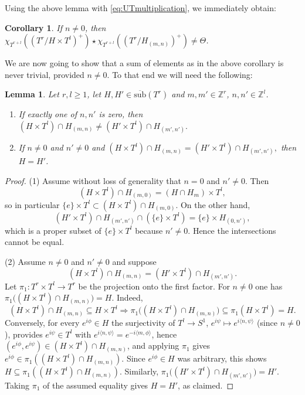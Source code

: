 \documentclass[reqno,twoside,12pt]{amsart}
\newtheorem{Corollary}[Remark]{Corollary}
\newtheorem{Lemma}[Remark]{Lemma}
\numberwithin{equation}{section} \errorcontextlines=0
\newcommand{\sub}{\overline{\mathrm{sub}}}
\begin{document}
Using the above lemma with \eqref{eq:UTmultiplication}, we immediately obtain:
\begin{Corollary}\label{cor:nontr-prod}
If $n\neq 0$, then
$\chi_{T^{r+l}} ((T^r/H\times T^{ l})^+ )\star \chi_{T^{r+l}} ((T^{r}/H_{(m,n)})^+ )\neq \Theta$.
\end{Corollary}

We are now going to show that a sum of elements as in the above corollary is never trivial, provided $n\neq 0$. To that end we will need the following:

\begin{Lemma}\label{lem:intersections}
Let $r,l\ge 1$, let $H,H'\in\sub(T^r)$ and $m,m'\in\mathbb{Z}^r$, $n,n'\in\mathbb{Z}^l$.
\begin{enumerate}
\item If exactly one of $n,n'$ is zero, then
$
(H\times T^l)\cap H_{(m,n)}\ne (H'\times T^l)\cap H_{(m',n')}.
$
\item If $n\ne 0$ and $n'\ne 0$ and
$
(H\times T^l)\cap H_{(m,n)}=(H'\times T^l)\cap H_{(m',n')},
$
then $H=H'$.
\end{enumerate}
\end{Lemma}

\begin{proof}
(1) Assume without loss of generality that $n=0$ and $n'\ne 0$. Then
\[
(H\times T^l)\cap H_{(m,0)}=(H\cap H_m)\times T^l,
\]
so in particular $\{e\}\times T^l\subset (H\times T^l)\cap H_{(m,0)}$. On the other hand,
\[
(H'\times T^l)\cap H_{(m',n')}\cap(\{e\}\times T^l)=\{e\}\times H_{(0,n')},
\]
which is a proper subset of $\{e\}\times T^l$ because $n'\ne 0$. Hence the intersections cannot be equal.

(2) Assume $n\ne 0$ and $n'\ne 0$ and suppose
$$
(H\times T^l)\cap H_{(m,n)}=(H'\times T^l)\cap H_{(m',n')}.
$$
Let $\pi_1:T^r\times T^l\to T^r$ be the projection onto the first factor. For $n\ne 0$ one has
$
\pi_1\big((H\times T^l)\cap H_{(m,n)}\big)=H.
$
Indeed,
$$(H\times T^l)\cap H_{(m,n)}\subseteq H\times T^l\Rightarrow
\pi_1\big((H\times T^l)\cap H_{(m,n)}\big)\subseteq \pi_1(H\times T^l) =H.$$
Conversely, for every $e^{i\phi}\in H$ the surjectivity of $T^l\to S^1$, $e^{i\psi}\mapsto e^{i\langle n,\psi\rangle}$ (since $n\ne 0$), provides $e^{i\psi}\in T^l$ with $e^{i\langle n,\psi\rangle}=e^{-i\langle m,\phi\rangle}$, hence $(e^{i\phi},e^{i\psi})\in(H\times T^l)\cap H_{(m,n)}$, and applying $\pi_1$ gives $e^{i\phi}\in\pi_1((H\times T^l)\cap H_{(m,n)})$. Since $e^{i\phi}\in H$ was arbitrary, this shows $H\subseteq\pi_1((H\times T^l)\cap H_{(m,n)})$.
Similarly,
$
\pi_1\big((H'\times T^l)\cap H_{(m',n')}\big)=H'.
$
Taking $\pi_1$ of the assumed equality gives $H=H'$, as claimed.
\end{proof}
\end{document}
